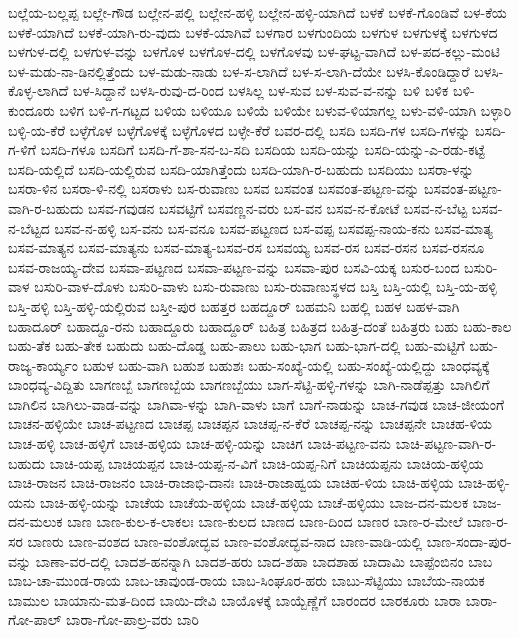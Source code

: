 {ಬಲ್ಲೆಯ-ಬಲ್ಲಪ್ಪ
ಬಲ್ಲೇ-ಗೌಡ
ಬಲ್ಲೇನ-ಪಲ್ಲಿ
ಬಲ್ಲೇನ-ಹಳ್ಳಿ
ಬಲ್ಲೇನ-ಹಳ್ಳಿ-ಯಾಗಿದೆ
ಬಳಕೆ
ಬಳಕೆ-ಗೊಂಡಿವೆ
ಬಳ-ಕೆಯ
ಬಳಕೆ-ಯಾಗಿದೆ
ಬಳಕೆ-ಯಾಗಿ-ರು-ವುದು
ಬಳಕೆ-ಯಾಗಿವೆ
ಬಳಗಾರ
ಬಳಗುಂದಿಯ
ಬಳಗುಳ
ಬಳಗುಳಕ್ಕೆ
ಬಳಗುಳದ
ಬಳಗುಳ-ದಲ್ಲಿ
ಬಳಗುಳ-ವನ್ನು
ಬಳಗೊಳ
ಬಳಗೊಳ-ದಲ್ಲಿ
ಬಳಗೊಳವು
ಬಳ-ಘಟ್ಟ-ವಾಗಿದೆ
ಬಳ-ಪದ-ಕಲ್ಲು-ಮಂಟಿ
ಬಳ-ಮಡು-ನಾ-ಡಿನಲ್ಲಿತ್ತೆಂದು
ಬಳ-ಮಡು-ನಾಡು
ಬಳ-ಸ-ಲಾಗಿದೆ
ಬಳ-ಸ-ಲಾಗಿ-ದೆಯೇ
ಬಳಸಿ-ಕೊಂಡಿದ್ದಾರೆ
ಬಳಸಿ-ಕೊಳ್ಳ-ಲಾಗಿದೆ
ಬಳ-ಸಿದ್ದಾನೆ
ಬಳಸಿ-ರುವು-ದ-ರಿಂದ
ಬಳಸಿಲ್ಲ
ಬಳ-ಸುವ
ಬಳ-ಸುವ-ವ-ನನ್ನು
ಬಳಿ
ಬಳಿಕ
ಬಳಿ-ಕುಂದೂರು
ಬಳಿಗ
ಬಳಿ-ಗ-ಗಟ್ಟದ
ಬಳಿಯ
ಬಳಿಯೂ
ಬಳಿಯೆ
ಬಳಿಯೇ
ಬಳುವ-ಳಿಯಾಗಲ್ಲ
ಬಳು-ವಳಿ-ಯಾಗಿ
ಬಳ್ಳಾರಿ
ಬಳ್ಳಿ-ಯ-ಕೆರೆ
ಬಳ್ಳೆಗೊಳ
ಬಳ್ಳೆಗೊಳಕ್ಕೆ
ಬಳ್ಳೆಗೊಳದ
ಬಳ್ಳೇ-ಕೆರೆ
ಬವರ-ದಲ್ಲಿ
ಬಸದಿ
ಬಸದಿ-ಗಳ
ಬಸದಿ-ಗಳನ್ನು
ಬಸದಿ-ಗ-ಳಿಗೆ
ಬಸದಿ-ಗಳೂ
ಬಸದಿಗೆ
ಬಸದಿ-ಗೆ-ಶಾ-ಸನ-ಬ-ಸದಿ
ಬಸದಿಯ
ಬಸದಿ-ಯನ್ನು
ಬಸದಿ-ಯನ್ನು-ಎ-ರಡು-ಕಟ್ಟೆ
ಬಸದಿ-ಯಲ್ಲಿದೆ
ಬಸದಿ-ಯಲ್ಲಿರುವ
ಬಸದಿ-ಯಾಗಿತ್ತೆಂದು
ಬಸದಿ-ಯಾಗಿ-ರ-ಬಹುದು
ಬಸದಿಯು
ಬಸರಾ-ಳನ್ನು
ಬಸರಾ-ಳಿನ
ಬಸರಾ-ಳಿ-ನಲ್ಲಿ
ಬಸರಾಳು
ಬಸ-ರುವಾಣು
ಬಸವ
ಬಸವಂತ
ಬಸವಂತ-ಪಟ್ಟಣ-ವನ್ನು
ಬಸವಂತ-ಪಟ್ಟಣ-ವಾಗಿ-ರ-ಬಹುದು
ಬಸವ-ಗವುಡನ
ಬಸವಟ್ಟಿಗೆ
ಬಸವಣ್ಣನ-ವರು
ಬಸ-ವನ
ಬಸವ-ನ-ಕೋಟೆ
ಬಸವ-ನ-ಬೆಟ್ಟ
ಬಸವ-ನ-ಬೆಟ್ಟದ
ಬಸವ-ನ-ಹಳ್ಳಿ
ಬಸ-ವನು
ಬಸ-ವನೂ
ಬಸವ-ಪಟ್ಟಣದ
ಬಸ-ವಪ್ಪ
ಬಸವಪ್ಪ-ನಾಯ-ಕನು
ಬಸವ-ಮಾತ್ಯ
ಬಸವ-ಮಾತ್ಯನ
ಬಸವ-ಮಾತ್ಯನು
ಬಸವ-ಮಾತ್ಯ-ಬಸವ-ರಸ
ಬಸವಯ್ಯ
ಬಸವ-ರಸ
ಬಸವ-ರಸನ
ಬಸವ-ರಸನೂ
ಬಸವ-ರಾಜಯ್ಯ-ದೇವ
ಬಸವಾ-ಪಟ್ಟಣದ
ಬಸವಾ-ಪಟ್ಟಣ-ವನ್ನು
ಬಸವಾ-ಪುರ
ಬಸವಿ-ಯಕ್ಕ
ಬಸುರ-ಬಂದ
ಬಸುರಿ-ವಾಳ
ಬಸುರಿ-ವಾಳ-ದೊಳು
ಬಸುರಿ-ವಾಳು
ಬಸು-ರುವಾಣು
ಬಸು-ರುವಾಣುಸ್ಥಳದ
ಬಸ್ತಿ
ಬಸ್ತಿ-ಯಲ್ಲಿ
ಬಸ್ತಿ-ಯ-ಹಳ್ಳಿ
ಬಸ್ತಿ-ಹಳ್ಳಿ
ಬಸ್ತಿ-ಹಳ್ಳಿ-ಯಲ್ಲಿರುವ
ಬಸ್ತೀ-ಪುರ
ಬಹತ್ತರ
ಬಹದ್ದೂರ್
ಬಹಮನಿ
ಬಹಲ್ಲಿ
ಬಹಳ
ಬಹಳ-ವಾಗಿ
ಬಹಾದೂರ್
ಬಹಾದ್ದೂ-ರನು
ಬಹಾದ್ದೂರು
ಬಹಾದ್ದೂರ್
ಬಹಿತ್ರ
ಬಹಿತ್ರದ
ಬಹಿತ್ರ-ದಂತೆ
ಬಹಿತ್ರರು
ಬಹು
ಬಹು-ಕಾಲ
ಬಹು-ತೆಕ
ಬಹು-ತೇಕ
ಬಹುದು
ಬಹು-ದೊಡ್ಡ
ಬಹು-ಪಾಲು
ಬಹು-ಭಾಗ
ಬಹು-ಭಾಗ-ದಲ್ಲಿ
ಬಹು-ಮಟ್ಟಿಗೆ
ಬಹು-ರಾಜ್ಯ-ಕಾರ್ಯ್ಯಂ
ಬಹುಳ
ಬಹು-ವಾಗಿ
ಬಹುಶ
ಬಹುಶಃ
ಬಹು-ಸಂಖ್ಯೆ-ಯಲ್ಲಿ
ಬಹು-ಸಂಖ್ಯೆ-ಯಲ್ಲಿದ್ದು
ಬಾಂಧವ್ಯಕ್ಕೆ
ಬಾಂಧವ್ಯ-ವಿದ್ದಿತು
ಬಾಗಣಬ್ಬೆ
ಬಾಗಣಬ್ಬೆಯ
ಬಾಗಣಬ್ಬೆಯು
ಬಾಗ-ಸೆಟ್ಟಿ-ಹಳ್ಳಿ-ಗಳನ್ನು
ಬಾಗಿ-ನಾಡೆಪ್ಪತ್ತು
ಬಾಗಿಲಿಗೆ
ಬಾಗಿಲಿನ
ಬಾಗಿಲು-ವಾಡ-ವನ್ನು
ಬಾಗಿವಾ-ಳನ್ನು
ಬಾಗಿ-ವಾಳು
ಬಾಗೆ
ಬಾಗೆ-ನಾಡುನ್ನು
ಬಾಚ-ಗವುಡ
ಬಾಚ-ಜೀಯಂಗೆ
ಬಾಚನ-ಹಳ್ಳಿಯೇ
ಬಾಚ-ಪಟ್ಟಣದ
ಬಾಚಪ್ಪ
ಬಾಚಪ್ಪನ
ಬಾಚಪ್ಪ-ನ-ಕೆರೆ
ಬಾಚಪ್ಪ-ನನ್ನು
ಬಾಚಪ್ಪನೇ
ಬಾಚಹ-ಳಿಯ
ಬಾಚ-ಹಳ್ಳಿ
ಬಾಚ-ಹಳ್ಳಿಗೆ
ಬಾಚ-ಹಳ್ಳಿಯ
ಬಾಚ-ಹಳ್ಳಿ-ಯನ್ನು
ಬಾಚಿಗ
ಬಾಚಿ-ಪಟ್ಟಣ-ವನು
ಬಾಚಿ-ಪಟ್ಟಣ-ವಾಗಿ-ರ-ಬಹುದು
ಬಾಚಿ-ಯಪ್ಪ
ಬಾಚಿಯಪ್ಪನ
ಬಾಚಿ-ಯಪ್ಪ-ನ-ವಿಗೆ
ಬಾಚಿ-ಯಪ್ಪ-ನಿಗೆ
ಬಾಚಿಯಪ್ಪನು
ಬಾಚಿಯ-ಹಳ್ಳಿಯ
ಬಾಚಿ-ರಾಜನ
ಬಾಚಿ-ರಾಜನಂ
ಬಾಚಿ-ರಾಜಾಭಿ-ದಾನಃ
ಬಾಚಿ-ರಾಜಾಹ್ವಯ
ಬಾಚಿಹ-ಳಿಯ
ಬಾಚಿ-ಹಳ್ಳಿಯ
ಬಾಚಿ-ಹಳ್ಳಿ-ಯನು
ಬಾಚಿ-ಹಳ್ಳಿ-ಯನ್ನು
ಬಾಚೆಯ
ಬಾಚೆಯ-ಹಳ್ಳಿಯ
ಬಾಚೆ-ಹಳ್ಳಿಯ
ಬಾಚೆ-ಹಳ್ಳಿಯು
ಬಾಜ-ದನ-ಮಲಕ
ಬಾಜ-ದನ-ಮಲುಕ
ಬಾಣ
ಬಾಣ-ಕುಲ-ಕ-ಲಾಕಲಃ
ಬಾಣ-ಕುಲದ
ಬಾಣದ
ಬಾಣ-ದಿಂದ
ಬಾಣರ
ಬಾಣ-ರ-ಮೇಲೆ
ಬಾಣ-ರ-ಸರ
ಬಾಣರು
ಬಾಣ-ವಂಶದ
ಬಾಣ-ವಂಶೋದ್ಭವ
ಬಾಣ-ವಂಶೋದ್ಭವ-ನಾದ
ಬಾಣ-ವಾಡಿ-ಯಲ್ಲಿ
ಬಾಣ-ಸಂದಾ-ಪುರ-ವನ್ನು
ಬಾಣಾ-ವರ-ದಲ್ಲಿ
ಬಾದಶ-ಹನನ್ನಾಗಿ
ಬಾದಶ-ಹರು
ಬಾದ-ಶಹಾ
ಬಾದಶಾಹ
ಬಾದಾಮಿ
ಬಾಪ್ಪೆಂಬಿನಂ
ಬಾಬ
ಬಾಬ-ಚಾ-ಮುಂಡ-ರಾಯ
ಬಾಬ-ಚಾವುಂಡ-ರಾಯ
ಬಾಬ-ಸಿಂಘೂರ-ಹರು
ಬಾಬು-ಸೆಟ್ಟಿಯು
ಬಾಬೆಯ-ನಾಯಕ
ಬಾಮುಲ
ಬಾಯಾನು-ಮತ-ದಿಂದ
ಬಾಯಿ-ದೇವಿ
ಬಾಯೊಳಕ್ಕೆ
ಬಾಯ್ಬೆಣ್ಣೆಗೆ
ಬಾರಂದರ
ಬಾರಕೂರು
ಬಾರಾ
ಬಾರಾ-ಗೋ-ಪಾಲ್
ಬಾರಾ-ಗೋ-ಪಾಲ್ರ-ವರು
ಬಾರಿ
}
